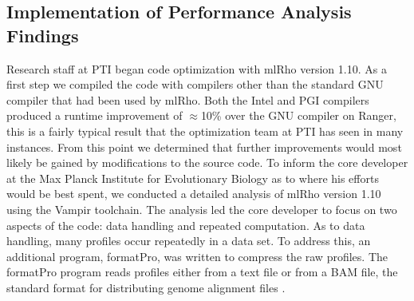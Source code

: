 \documentclass{sig-alternate}
\begin{document}
\subsection{Implementation of  Performance Analysis Findings}
Research staff at PTI began code optimization with mlRho version 1.10. As a first step we compiled
the code with compilers other than the standard GNU compiler that had been used by mlRho. Both the
Intel and PGI compilers produced a runtime improvement of $\approx$10\% over the GNU compiler on Ranger, this
is a fairly typical result that the optimization team at PTI has seen in many instances. From this point we
determined that further improvements would most likely be gained by modifications to the source code. To
inform the core developer at the Max Planck Institute for Evolutionary Biology as to
where his efforts would be best spent, we conducted a detailed analysis of mlRho version 1.10 using
the Vampir toolchain. The analysis led the core developer to focus on two aspects of the code: data handling
and repeated computation. As to data handling, many profiles occur repeatedly in a data set. To address this,
an additional program, formatPro, was written to compress the raw profiles. The formatPro program reads profiles either from a text
file or from a BAM file, the standard format for distributing genome alignment files \citep{li09:seq}. 
\end{document}
